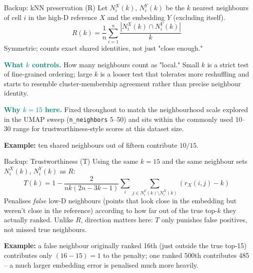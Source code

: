 \documentclass[aspectratio=169,10pt]{beamer}
\begin{document}
\begin{frame}{Backup: kNN preservation (R)}
  Let $N_i^X(k)$, $N_i^Y(k)$ be the $k$ nearest neighbours of cell $i$ in the high-D
  reference $X$ and the embedding $Y$ (excluding itself).
  \[
    R(k)=\frac{1}{n}\sum_{i=1}^n\frac{|N_i^X(k)\cap N_i^Y(k)|}{k}
  \]
  \small Symmetric; counts exact shared identities, not just "close enough."\par\medskip
  \textcolor{Teal}{\textbf{What $k$ controls.}} How many neighbours count as "local." Small $k$
  is a strict test of fine-grained ordering; large $k$ is a looser test that tolerates more
  reshuffling and starts to resemble cluster-membership agreement rather than precise
  neighbour identity.\par\smallskip
  \textcolor{Teal}{\textbf{Why $k=15$ here.}} Fixed throughout to match the neighbourhood scale
  explored in the UMAP sweep (\texttt{n\_neighbors} 5--50) and sits within the commonly used
  10--30 range for trustworthiness-style scores at this dataset size.\par\medskip
  \textbf{Example:} ten shared neighbours out of fifteen contribute $10/15$.\par\smallskip
\end{frame}

\begin{frame}{Backup: Trustworthiness (T)}
  Using the same $k=15$ and the same neighbour sets $N_i^X(k)$, $N_i^Y(k)$ as $R$:
  \[
    T(k)=1-\frac{2}{nk(2n-3k-1)}\sum_i\sum_{j\in N_i^Y(k)\setminus N_i^X(k)}(r_X(i,j)-k)
  \]
  \small Penalises \emph{false} low-D neighbours (points that look close in the embedding but
  weren't close in the reference) according to how far out of the true top-$k$ they actually
  ranked. Unlike $R$, direction matters here: $T$ only punishes false positives, not missed
  true neighbours.\par\medskip
  \textbf{Example:} a false neighbour originally ranked 16th (just outside the true top-15)
  contributes only $(16-15)=1$ to the penalty; one ranked 500th contributes 485 -- a much larger
  embedding error is penalised much more heavily.
\end{frame}
\end{document}
